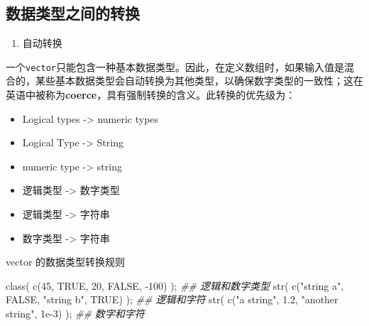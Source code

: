 \documentclass[
]{article}
\newenvironment{Shaded}{}{}
\newcommand{\ConstantTok}[1]{\textcolor[rgb]{0.53,0.00,0.00}{#1}}
\newcommand{\DecValTok}[1]{\textcolor[rgb]{0.25,0.63,0.44}{#1}}
\newcommand{\DocumentationTok}[1]{\textcolor[rgb]{0.73,0.13,0.13}{\textit{#1}}}
\newcommand{\FloatTok}[1]{\textcolor[rgb]{0.25,0.63,0.44}{#1}}
\newcommand{\FunctionTok}[1]{\textcolor[rgb]{0.02,0.16,0.49}{#1}}
\newcommand{\NormalTok}[1]{#1}
\newcommand{\SpecialCharTok}[1]{\textcolor[rgb]{0.25,0.44,0.63}{#1}}
\newcommand{\StringTok}[1]{\textcolor[rgb]{0.25,0.44,0.63}{#1}}
\begin{document}
\hypertarget{ux6570ux636eux7c7bux578bux4e4bux95f4ux7684ux8f6cux6362}{%
\subsection{数据类型之间的转换}\label{ux6570ux636eux7c7bux578bux4e4bux95f4ux7684ux8f6cux6362}}

\begin{enumerate}
\def\labelenumi{\arabic{enumi}.}
\item
  自动转换
\end{enumerate}

一个\texttt{vector}只能包含一种基本数据类型。因此，在定义数组时，如果输入值是混合的，某些基本数据类型会自动转换为其他类型，以确保数字类型的一致性；这在英语中被称为\textbf{coerce}，具有强制转换的含义。此转换的优先级为：

\begin{itemize}
\item
  Logical types -\textgreater{} numeric types
\item
  Logical Type -\textgreater{} String
\item
  numeric type -\textgreater{} string
\item
  逻辑类型 -\textgreater{} 数字类型
\item
  逻辑类型 -\textgreater{} 字符串
\item
  数字类型 -\textgreater{} 字符串
\end{itemize}

vector 的数据类型转换规则

\begin{Shaded}
\begin{Highlighting}[]
\FunctionTok{class}\NormalTok{( }\FunctionTok{c}\NormalTok{(}\DecValTok{45}\NormalTok{, }\ConstantTok{TRUE}\NormalTok{, }\DecValTok{20}\NormalTok{, }\ConstantTok{FALSE}\NormalTok{, }\SpecialCharTok{{-}}\DecValTok{100}\NormalTok{) ); }\DocumentationTok{\#\# 逻辑和数字类型}
\FunctionTok{str}\NormalTok{( }\FunctionTok{c}\NormalTok{(}\StringTok{"string a"}\NormalTok{, }\ConstantTok{FALSE}\NormalTok{, }\StringTok{"string b"}\NormalTok{, }\ConstantTok{TRUE}\NormalTok{) ); }\DocumentationTok{\#\# 逻辑和字符}
\FunctionTok{str}\NormalTok{( }\FunctionTok{c}\NormalTok{(}\StringTok{"a string"}\NormalTok{, }\FloatTok{1.2}\NormalTok{, }\StringTok{"another string"}\NormalTok{, }\FloatTok{1e{-}3}\NormalTok{) ); }\DocumentationTok{\#\# 数字和字符}
\end{Highlighting}
\end{Shaded}
\end{document}
